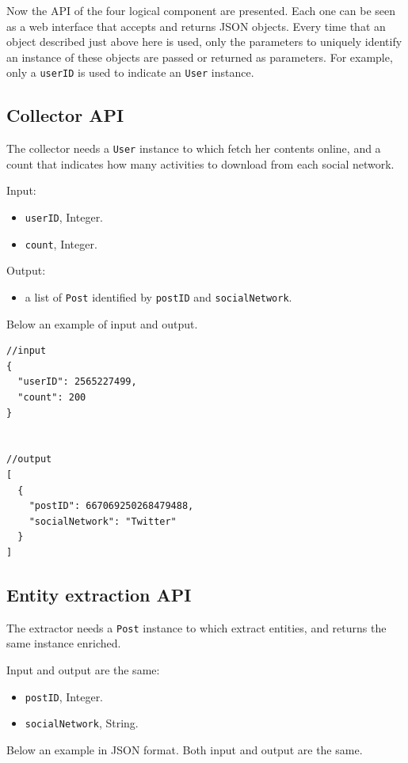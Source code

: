 Now the API of the four logical component are presented. Each one can be seen as a web interface that accepts and returns JSON objects. Every time that an object described just above here is used, only the parameters to uniquely identify an instance of these objects are passed or returned as parameters. For example, only a \texttt{userID} is used to indicate an \texttt{User} instance.

\subsection{Collector API}
The collector needs a \texttt{User} instance to which fetch her contents online, and a count that indicates how many activities to download from each social network.

Input:
\begin{itemize}
\item \texttt{userID}, Integer.
\item \texttt{count}, Integer.
\end{itemize}

Output:
\begin{itemize}
\item a list of \texttt{Post} identified by \texttt{postID} and \texttt{socialNetwork}.
\end{itemize}

Below an example of input and output.
\begin{multicols}{2}
\begin{Verbatim}
//input
{
  "userID": 2565227499,
  "count": 200
}


//output
[
  {
    "postID": 667069250268479488,
    "socialNetwork": "Twitter"
  }
]
\end{Verbatim}
\end{multicols}

\subsection{Entity extraction API}
The extractor needs a \texttt{Post} instance to which extract entities, and returns the same instance enriched.

Input and output are the same:
\begin{itemize}
\item \texttt{postID}, Integer.
\item \texttt{socialNetwork}, String.
\end{itemize}

Below an example in JSON format. Both input and output are the same.


